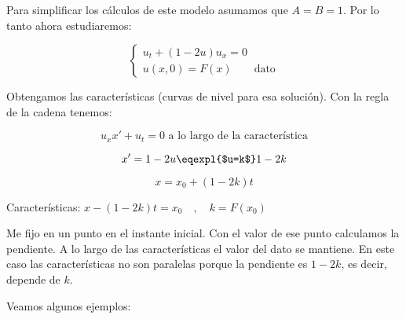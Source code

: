 		Para simplificar los cálculos de este modelo asumamos que $A = B = 1$. Por lo tanto ahora estudiaremos:

		\begin{equation*}
			\left\{
			\begin{array}{l}
				u_t + (1-2u)u_{x} = 0 \\
				u(x, 0) = F(x) \quad \quad \text{dato}
			\end{array}
			\right.
		\end{equation*}

		Obtengamos las características (curvas de nivel para esa solución). Con la regla de la cadena tenemos:

		$$u_x x' + u_t = 0 \text{ a lo largo de la característica}$$

		$$x' = 1 - 2u \eqexpl{$u=k$} 1 - 2k$$

		$$x = x_0 + (1-2k)t$$

		Características:
		\( x - (1-2k)t = x_0\quad,\quad k=F(x_0)  \label{eq:caracteristicas_realistas} \)

		Me fijo en un punto en el instante inicial. Con el valor de ese punto calculamos la pendiente. A lo largo de las características el valor del dato se mantiene. En este caso las características no son paralelas porque la pendiente es $1-2k$, es decir, depende de $k$.

		\begin{figure}[!htb]
			\centering
			\caption{}
			\label{fig:rectasDivergentes}
		\end{figure}

		\newpage

		Veamos algunos ejemplos:

